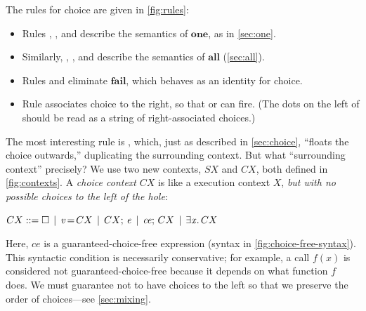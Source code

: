 \documentclass[acmsmall]{acmart}
\newcommand{\Conid}[1]{\mathit{#1}}
\newcommand{\Varid}[1]{\mathit{#1}}
\begin{document}
The rules for choice are given in \cref{fig:rules}:
\begin{itemize}
\item Rules , , and  describe
  the semantics of \ensuremath{\textbf{one}}, as in \cref{sec:one}.
\item Similarly, , , and  describe
  the semantics of \ensuremath{\textbf{all}} (\cref{sec:all}).
\item Rules  and  eliminate \ensuremath{\textbf{fail}}, which behaves as
  an identity for choice.
\item Rule  associates choice to the right, so that  or 
  can fire.  (The dots on the left of  should be read as
  a string of right-associated choices.)
\end{itemize}
The most interesting rule is , which, just as described in \cref{sec:choice},
``floats the choice outwards,'' duplicating the surrounding context.
But what ``surrounding context'' precisely? We use two new contexts, \ensuremath{\Conid{SX}} and \ensuremath{CX}, both
defined in \cref{fig:contexts}. A \emph{choice context} \ensuremath{CX} is like a
execution context \ensuremath{X}, \emph{but with no possible
choices to the left of the hole}:
\begin{center}$
CX ::= \hole \vb \ensuremath{\Varid{v}\hspace{-0.14em}=\hspace{-0.14em}CX} \vb \ensuremath{CX;\,\Varid{e}} \vb \ensuremath{\Varid{ce};\,CX} \vb \ensuremath{\exists\Varid{x}.\,CX}
$\end{center}
Here, \ensuremath{\Varid{ce}} is a guaranteed-choice-free expression (syntax in \cref{fig:choice-free-syntax}).
This syntactic condition is necessarily conservative; for example, a call \ensuremath{\Varid{f}(\Varid{x})}
is considered not guaranteed-choice-free because it depends on what function \ensuremath{\Varid{f}} does.
We must guarantee not to have choices to the left so that we preserve the order of choices---see \cref{sec:mixing}.
\end{document}
